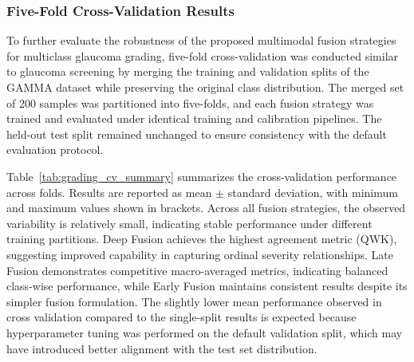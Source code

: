 \documentclass[preprint,12pt]{elsarticle}
\begin{document}
\subsubsection{Five-Fold Cross-Validation Results}
\label{subsubsec:grading_cv}

To further evaluate the robustness of the proposed multimodal fusion strategies for multiclass glaucoma grading, five-fold cross-validation was conducted similar to glaucoma screening by merging the training and validation splits of the GAMMA dataset while preserving the original class distribution. The merged set of 200 samples was partitioned into five-folds, and each fusion strategy was trained and evaluated under identical training and calibration pipelines. The held-out test split remained unchanged to ensure consistency with the default evaluation protocol.

Table~\ref{tab:grading_cv_summary} summarizes the cross-validation performance across folds. Results are reported as mean $\pm$ standard deviation, with minimum and maximum values shown in brackets. Across all fusion strategies, the observed variability is relatively small, indicating stable performance under different training partitions. Deep Fusion achieves the highest agreement metric (QWK), suggesting improved capability in capturing ordinal severity relationships. Late Fusion demonstrates competitive macro-averaged metrics, indicating balanced class-wise performance, while Early Fusion maintains consistent results despite its simpler fusion formulation. The slightly lower mean performance observed in cross
validation compared to the single-split results is expected because hyperparameter tuning was performed on the default validation split, which may have introduced better
alignment with the test set distribution.
\end{document}
